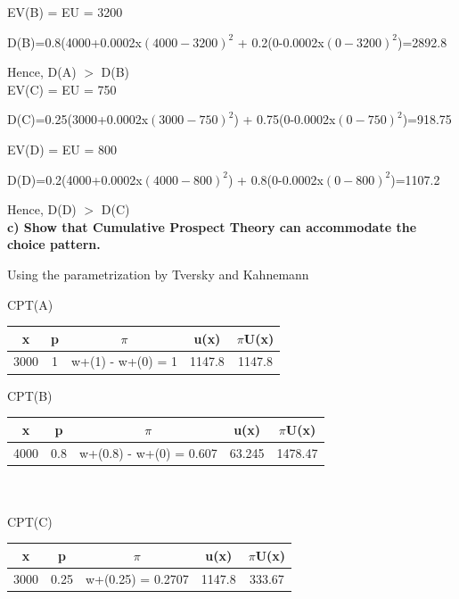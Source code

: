 \documentclass{article}
\begin{document}
  EV(B) = EU = 3200
  
  D(B)=0.8(4000+0.0002x$(4000-3200)^2$ + 0.2(0-0.0002x$(0-3200)^2$)=2892.8
  
  Hence, D(A) $>$ D(B)\\

EV(C) = EU = 750

D(C)=0.25(3000+0.0002x$(3000-750)^2$) + 0.75(0-0.0002x$(0-750)^2$)=918.75

EV(D) = EU = 800

D(D)=0.2(4000+0.0002x$(4000-800)^2$) + 0.8(0-0.0002x$(0-800)^2$)=1107.2

  Hence, D(D) $>$ D(C)\\
  
\textbf{ c) Show that Cumulative Prospect Theory can accommodate the choice pattern. }   

\vspace{2mm}

Using the parametrization by Tversky and Kahnemann

\vspace{3mm}

CPT(A)

	\begin{tabular}{|c|c|c|c|c|}
	\hline
		x    & p & $\pi$         & u(x)        & $\pi$U(x)  \\  \hline
			3000 & 1 & w+(1) - w+(0) = 1 &1147.8 & 1147.8 \\
	\hline
	\end{tabular} 
\vspace{7mm}

CPT(B)

	\begin{tabular}{|c|c|c|c|c|}
		\hline
		x    & p & $\pi$             & u(x) & $\pi$U(x) \\  \hline
		4000 & 0.8 & w+(0.8) - w+(0) = 0.607 & 63.245  &  1478.47 \\
		\hline
	\end{tabular} \\ \\

CPT(C)

\begin{tabular}{|c|c|c|c|c|}
	\hline
	x    & p & $\pi$             & u(x) & $\pi$U(x) \\  \hline
	3000 & 0.25 & w+(0.25) = 0.2707 & 1147.8  &  333.67 \\
	\hline
\end{tabular} \\ \\
\end{document}
